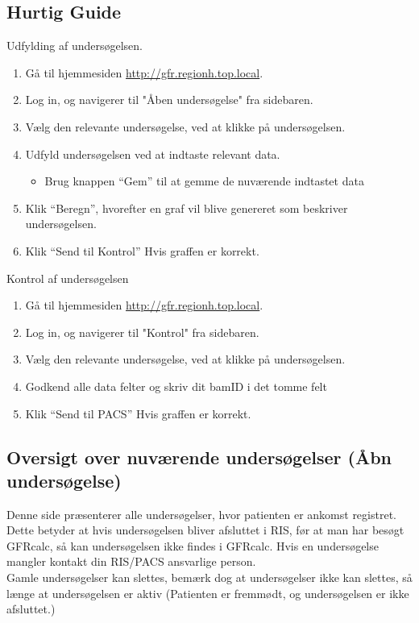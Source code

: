 \documentclass{article}
\begin{document}
\subsection{Hurtig Guide}
Udfylding af undersøgelsen.
\begin{enumerate}
	\item Gå til hjemmesiden \url{http://gfr.regionh.top.local}.
	\item Log in, og navigerer til "Åben undersøgelse" fra sidebaren. 
	\item Vælg den relevante undersøgelse, ved at klikke på undersøgelsen.
	\item Udfyld undersøgelsen ved at indtaste relevant data.
	\begin{itemize}
		\item Brug knappen “Gem” til at gemme de nuværende indtastet data
	\end{itemize}
	\item Klik “Beregn”, hvorefter en graf vil blive genereret som beskriver undersøgelsen.
	\item Klik “Send til Kontrol” Hvis graffen er korrekt.
\end{enumerate} 
Kontrol af undersøgelsen
\begin{enumerate}
	\item Gå til hjemmesiden \url{http://gfr.regionh.top.local}.
	\item Log in, og navigerer til "Kontrol" fra sidebaren. 
	\item Vælg den relevante undersøgelse, ved at klikke på undersøgelsen.
	\item Godkend alle data felter og skriv dit bamID i det tomme felt
	\item Klik “Send til PACS” Hvis graffen er korrekt.
\end{enumerate} 

\subsection{Oversigt over nuværende undersøgelser (Åbn undersøgelse)}\label{list_study}
Denne side præsenterer alle undersøgelser, hvor patienten er ankomst registret. Dette betyder at hvis undersøgelsen bliver afsluttet i RIS, før at man har besøgt GFRcalc, så kan undersøgelsen ikke findes i GFRcalc. Hvis en undersøgelse mangler kontakt din RIS/PACS ansvarlige person. \\

Gamle undersøgelser kan slettes, bemærk dog at undersøgelser ikke kan slettes, så længe at undersøgelsen er aktiv (Patienten er fremmødt, og undersøgelsen er ikke afsluttet.) \\
\end{document}

